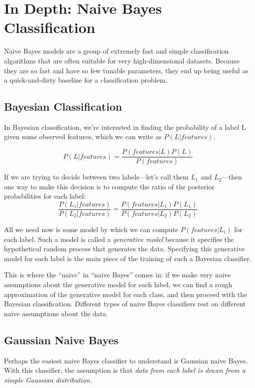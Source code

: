 \chapter{In Depth: Naive Bayes Classification\label{Ch41}}

Naive Bayes models are a group of extremely fast and simple classification algorithms that are often suitable for very high-dimensional datasets. Because they are so fast and have so few tunable parameters, they end up being useful as a quick-and-dirty baseline for a classification problem.

\section{Bayesian Classification}
In Bayesian classification, we’re interested in
finding the probability of a label L given some observed features, which we can write
as $P(L|features)$.

\begin{equation*}
    P(L|features)=\frac{P(features|L)P(L)}{P(features)}
\end{equation*}

If we are trying to decide between two labels—let’s call them $L_1$ and $L_2$—then one way
to make this decision is to compute the ratio of the posterior probabilities for each
label:
\begin{equation*}
    \frac{P(L_1|features)}{P(L_2|features)}=\frac{P(features|L_1)P(L_1)}{P(features|L_2)P(L_2)}
\end{equation*}

All we need now is some model by which we can compute $P(features|L_i)$ for each
label. Such a model is called a \textit{generative model} because it specifies the hypothetical
random process that generates the data. Specifying this generative model for each
label is the main piece of the training of such a Bayesian classifier.

This is where the “naive” in “naive Bayes” comes in: if we make very naive assumptions about the generative model for each label, we can find a rough approximation of
the generative model for each class, and then proceed with the Bayesian classification.
Different types of naive Bayes classifiers rest on different naive assumptions about the
data.

\section{Gaussian Naive Bayes}
Perhaps the easiest naive Bayes classifier to understand is Gaussian naive Bayes. With
this classifier, the assumption is that \textit{data from each label is drawn from a simple Gaussian distribution.}

